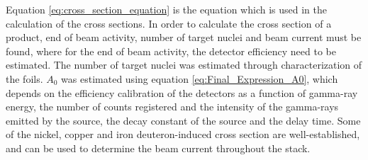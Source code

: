\documentclass[a4paper,11pt,twoside]{book}
\begin{document}
\noindent 


\noindent 

\noindent 
Equation \ref{eq:cross_section_equation} is the equation which is used in the calculation of the cross sections. In order to calculate the cross section of a product, end of beam activity, number of target nuclei and beam current must be found, where for the end of beam activity, the detector efficiency need to be estimated. The number of target nuclei was estimated through characterization of the foils. $A_0$ was estimated using equation \ref{eq:Final_Expression_A0}, which depends on the efficiency calibration of the detectors as a function of gamma-ray energy, the number of counts registered and the intensity of the gamma-rays emitted by the source, the decay constant of the source and the delay time. Some of the nickel, copper and iron deuteron-induced cross section are well-established, and can  be used to determine the beam current throughout the stack. 




\end{document}
